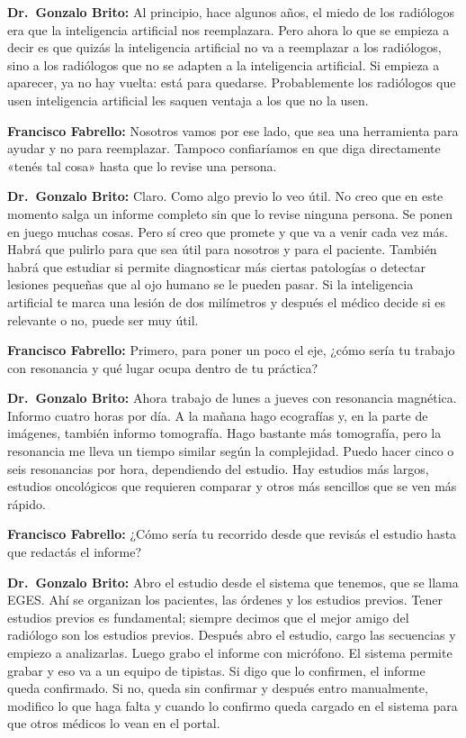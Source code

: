 \noindent\textbf{Dr.~Gonzalo Brito:} Al principio, hace algunos años, el miedo de los radiólogos era que la inteligencia artificial nos reemplazara. Pero ahora lo que se empieza a decir es que quizás la inteligencia artificial no va a reemplazar a los radiólogos, sino a los radiólogos que no se adapten a la inteligencia artificial. Si empieza a aparecer, ya no hay vuelta: está para quedarse. Probablemente los radiólogos que usen inteligencia artificial les saquen ventaja a los que no la usen.

\noindent\textbf{Francisco Fabrello:} Nosotros vamos por ese lado, que sea una herramienta para ayudar y no para reemplazar. Tampoco confiaríamos en que diga directamente «tenés tal cosa» hasta que lo revise una persona.

\noindent\textbf{Dr.~Gonzalo Brito:} Claro. Como algo previo lo veo útil. No creo que en este momento salga un informe completo sin que lo revise ninguna persona. Se ponen en juego muchas cosas. Pero sí creo que promete y que va a venir cada vez más. Habrá que pulirlo para que sea útil para nosotros y para el paciente. También habrá que estudiar si permite diagnosticar más ciertas patologías o detectar lesiones pequeñas que al ojo humano se le pueden pasar. Si la inteligencia artificial te marca una lesión de dos milímetros y después el médico decide si es relevante o no, puede ser muy útil.

\noindent\textbf{Francisco Fabrello:} Primero, para poner un poco el eje, ¿cómo sería tu trabajo con resonancia y qué lugar ocupa dentro de tu práctica?

\noindent\textbf{Dr.~Gonzalo Brito:} Ahora trabajo de lunes a jueves con resonancia magnética. Informo cuatro horas por día. A la mañana hago ecografías y, en la parte de imágenes, también informo tomografía. Hago bastante más tomografía, pero la resonancia me lleva un tiempo similar según la complejidad. Puedo hacer cinco o seis resonancias por hora, dependiendo del estudio. Hay estudios más largos, estudios oncológicos que requieren comparar y otros más sencillos que se ven más rápido.

\noindent\textbf{Francisco Fabrello:} ¿Cómo sería tu recorrido desde que revisás el estudio hasta que redactás el informe?

\noindent\textbf{Dr.~Gonzalo Brito:} Abro el estudio desde el sistema que tenemos, que se llama EGES. Ahí se organizan los pacientes, las órdenes y los estudios previos. Tener estudios previos es fundamental; siempre decimos que el mejor amigo del radiólogo son los estudios previos. Después abro el estudio, cargo las secuencias y empiezo a analizarlas. Luego grabo el informe con micrófono. El sistema permite grabar y eso va a un equipo de tipistas. Si digo que lo confirmen, el informe queda confirmado. Si no, queda sin confirmar y después entro manualmente, modifico lo que haga falta y cuando lo confirmo queda cargado en el sistema para que otros médicos lo vean en el portal.

